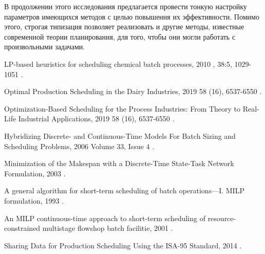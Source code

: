 \documentclass[12pt, twoside]{article}
\theoremstyle{definition}
\begin{document}
В продолжении этого исследования предлагается провести тонкую настройку параметров имеющихся методов с целью повышения их эффективности. Помимо этого, строгая типизация позволяет реализовать и другие методы, известные современной теории планирования, для того, чтобы они могли работать с произвольными задачами.

\begin{thebibliography}{99}

    LP-based heuristics for scheduling chemical batch processes, 2010
    , 38:5, 1029-1051
	.

    Optimal Production Scheduling in the Dairy Industries, 2019
     58 (16), 6537-6550
	.
	
    Optimization-Based Scheduling for the Process Industries: From Theory to Real-Life Industrial Applications, 2019
     58 (16), 6537-6550
	.
	
    Hybridizing Discrete- and Continuous-Time Models For Batch Sizing and
Scheduling Problems, 2006
     Volume 33, Issue 4
	.
	
    Minimization of the Makespan with a Discrete-Time State-Task Network Formulation, 2003
	.
	
    A general algorithm for short-term scheduling of batch operations—I. MILP formulation, 1993
	.
	
    An MILP continuous-time approach to short-term scheduling of resource-constrained multistage flowshop batch facilitie, 2001
	.
	
    Sharing Data for Production Scheduling Using the ISA-95 Standard, 2014
	.
		
\end{thebibliography}
\end{document}
